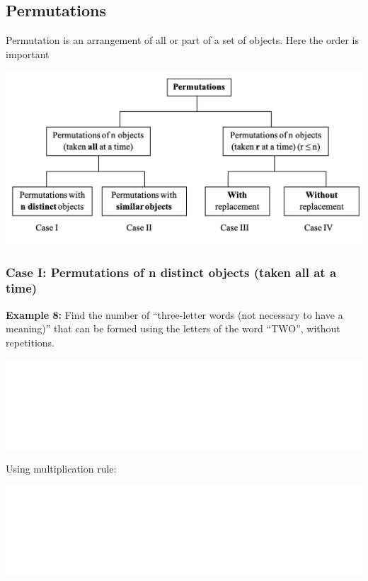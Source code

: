 \documentclass[]{book}
\begin{document}
\hypertarget{permutations}{%
\subsection{Permutations}\label{permutations}}

Permutation is an arrangement of all or part of a set of objects. Here the order is important

\begin{center}\includegraphics[width=1\linewidth]{figure/Permutations} \end{center}

\hypertarget{case-i-permutations-of-n-distinct-objects-taken-all-at-a-time}{%
\subsubsection{Case I: Permutations of n distinct objects (taken all at a time)}\label{case-i-permutations-of-n-distinct-objects-taken-all-at-a-time}}

\textbf{Example 8:} Find the number of ``three-letter words (not necessary to have a meaning)'' that can be formed using the letters of the word ``TWO'', without repetitions.

\begin{center}\includegraphics[width=1\linewidth]{figure/box84-1} \end{center}

Using multiplication rule:

\begin{center}\includegraphics[width=1\linewidth]{figure/box85-1} \end{center}
\end{document}
